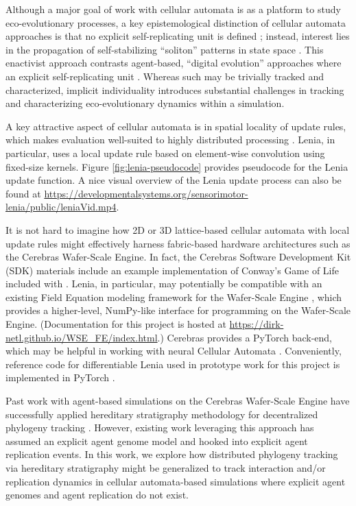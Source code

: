 Although a major goal of work with cellular automata is as a platform to study eco-evolutionary processes, a key epistemological distinction of cellular automata approaches is that no explicit self-replicating unit is defined \citep{hamon2022learning}; instead, interest lies in the propagation of self-stabilizing ``soliton'' patterns in state space \citep{chan2019lenia}.
This enactivist approach contrasts agent-based, ``digital evolution'' approaches where an explicit self-replicating unit \citep{pennock2007models}.
Whereas such may be trivially tracked and characterized, implicit individuality introduces substantial challenges in tracking and characterizing eco-evolutionary dynamics within a simulation.

A key attractive aspect of cellular automata is in spatial locality of update rules, which makes evaluation well-suited to highly distributed processing \citep{ackley2023robust}.
Lenia, in particular, uses a local update rule based on element-wise convolution using fixed-size kernels.
Figure \ref{fig:lenia-pseudocode} provides pseudocode for the Lenia update function.
A nice visual overview of the Lenia update process can also be found at \url{https://developmentalsystems.org/sensorimotor-lenia/public/leniaVid.mp4}.

It is not hard to imagine how 2D or 3D lattice-based cellular automata with local update rules might effectively harness fabric-based hardware architectures such as the Cerebras Wafer-Scale Engine.
In fact, the Cerebras Software Development Kit (SDK) materials include an example implementation of Conway's Game of Life included with \citep{cerebras2024gol}.
Lenia, in particular, may potentially be compatible with an existing Field Equation modeling framework for the Wafer-Scale Engine \citep{woo2022disruptive}, which provides a higher-level, NumPy-like interface for programming on the Wafer-Scale Engine.
(Documentation for this project is hosted at \url{https://dirk-netl.github.io/WSE_FE/index.html}.)
Cerebras provides a PyTorch back-end, which may be helpful in working with neural Cellular Automata \citep{cerebras2022pytorch}.
Conveniently, reference code for differentiable Lenia used in prototype work for this project is implemented in PyTorch \citep{hamon2022learning}.

Past work with agent-based simulations on the Cerebras Wafer-Scale Engine have successfully applied hereditary stratigraphy methodology for decentralized phylogeny tracking \citep{moreno2024trackable}.
However, existing work leveraging this approach has assumed an explicit agent genome model and hooked into explicit agent replication events.
In this work, we explore how distributed phylogeny tracking via hereditary stratigraphy might be generalized to track interaction and/or replication dynamics in cellular automata-based simulations where explicit agent genomes and agent replication do not exist.

